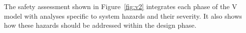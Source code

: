 The safety assessment shown in Figure~\ref{fig:v2} integrates each phase of the V model with analyses specific to system hazards and their severity. It also shows how these hazards should be addressed within the design phase. 

